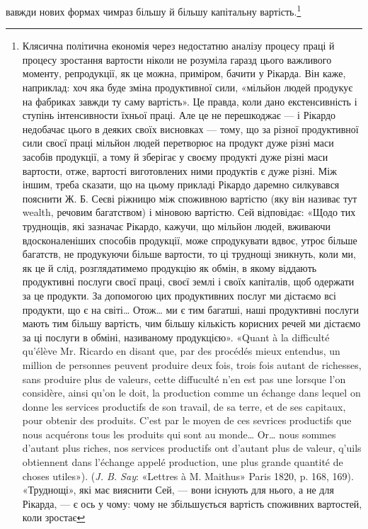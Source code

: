 вавжди нових формах чимраз більшу й більшу капітальну вартість.\footnote{
Клясична політична економія через недостатню аналізу процесу
праці й процесу зростання вартости ніколи не розуміла гаразд цього
важливого моменту, репродукції, як це можна, приміром, бачити у Рікарда.
Він каже, наприклад: хоч яка буде зміна продуктивної сили,
«мільйон людей продукує на фабриках завжди ту саму вартість». Це
правда, коли дано екстенсивність і ступінь інтенсивности їхньої праці.
Але це не перешкоджає — і Рікардо недобачає цього в деяких своїх висновках
— тому, що за різної продуктивної сили своєї праці мільйон людей
перетворює на продукт дуже різні маси засобів продукції, а тому й зберігає
у своєму продукті дуже різні маси вартости, отже, вартості виготовлених
ними продуктів є дуже різні. Між іншим, треба сказати, що на цьому
прикладі Рікардо даремно силкувався пояснити Ж. Б. Сеєві ріжницю
між споживною вартістю (яку він називає тут wealth, речовим багатством)
і міновою вартістю. Сей відповідає: «Щодо тих труднощів, які
зазначає Рікардо, кажучи, що мільйон людей, вживаючи вдосконаленіших
способів продукції, може спродукувати вдвоє, утроє більше багатств,
не продукуючи більше вартости, то ці труднощі зникнуть, коли ми, як
це й слід, розглядатимемо продукцію як обмін, в якому віддають продуктивні
послуги своєї праці, своєї землі і своїх капіталів, щоб одержати
за це продукти. За допомогою цих продуктивних послуг ми дістаємо всі
продукти, що є на світі\dots{} Отож\dots{} ми є тим багатші, наші продуктивні
послуги мають тим більшу вартість, чим більшу кількість корисних
речей ми дістаємо за ці послуги в обміні, називаному продукцією».
«Quant à la difficulté qu’élève Mr. Ricardo en disant que, par des procédés
mieux entendus, un million de personnes peuvent produire deux fois,
trois fois autant de richesses, sans produire plus de valeurs, cette diffuculté
n’en est pas une lorsque l’on considère, ainsi qu’on le doit, la production
comme un échange dans lequel on donne les services productifs de son travail,
de sa terre, et de ses capitaux, pour obtenir des produits. C’est par
le moyen de ces sevrices productifs que nous acquérons tous les produits
qui sont au monde\dots{} Or\dots{} nous sommes d’autant plus riches, nos services
productifs ont d’autant plus de valeur, q’uils obtiennent dans l’échange
appelé production, une plus grande quantité de choses utiles»). (\emph{J. B. Say}:
«Lettres à M. Maithus» Paris 1820, p. 168, 169). «Труднощі», які має
вияснити Сей, — вони існують для нього, а не для Рікарда, — є ось у
чому: чому не збільшується вартість споживних вартостей, коли зростає
}
